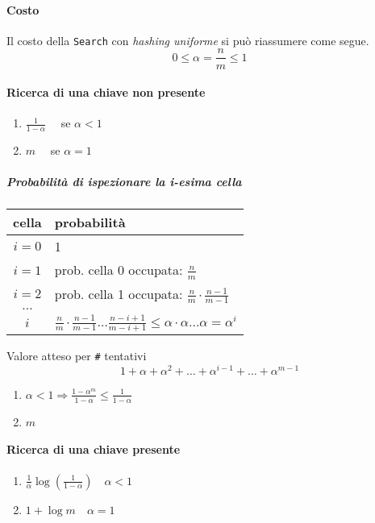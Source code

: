 \paragraph{Costo}
Il costo della \texttt{Search} con \emph{hashing uniforme} si può riassumere come segue.
$$0 \leq \alpha = \frac{n}{m} \leq 1$$

\paragraph{Ricerca di una chiave non presente}
\begin{enumerate}[label=(\alph*)]
    \item $\frac{1}{1-\alpha} \quad$ se $\alpha < 1$
    \item $m \quad$ se $\alpha = 1$ 
\end{enumerate}

\subparagraph{Probabilità di ispezionare la i-esima cella}
\begin{center}
    \begin{tabular}{c|l}
        \textbf{cella} & \textbf{probabilità} \\
        \hline
        $i = 0$ & 1 \\
        $i = 1$ & prob. cella 0 occupata: $\frac{n}{m}$ \\
        $i = 2$ & prob. cella 1 occupata: $\frac{n}{m} \cdot \frac{n-1}{m-1}$ \\
        $\dots$ \\
        $i$ & $\frac{n}{m} \cdot \frac{n-1}{m-1} \dots \frac{n-i+1}{m-i+1} \leq \alpha \cdot \alpha \dots \alpha = \alpha^i$
    \end{tabular}
\end{center}

Valore atteso per \verb|#| tentativi
$$1 + \alpha + \alpha^2 + \dots + \alpha^{i-1} + \dots + \alpha^{m-1}$$

\begin{enumerate}[label=(\alph*)]
    \item $\alpha < 1 \Rightarrow \frac{1 - \alpha^m}{1 - \alpha} \leq \frac{1}{1-\alpha}$ 
    \item $m$ 
\end{enumerate}

\paragraph{Ricerca di una chiave presente}
\begin{enumerate}[label=(\alph*)]
    \item $\frac{1}{\alpha} \log \left( \frac{1}{1-\alpha} \right) \quad \alpha < 1$
    \item $1 + \log m \quad \alpha = 1$
\end{enumerate}

